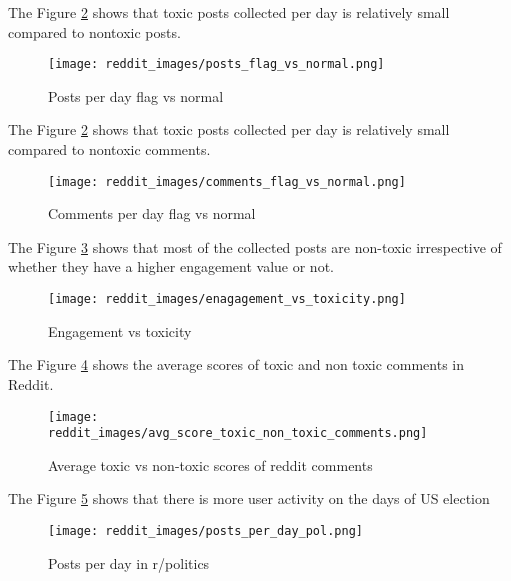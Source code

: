 \documentclass[sigconf]{acmart}
\begin{document}
The Figure \ref{fig:reddit_images/comments_flag_vs_normal} shows that toxic posts collected per day is relatively small compared to nontoxic posts.\newline
\begin{figure}[h]
    \centering
    \texttt{[image: reddit\_images/posts\_flag\_vs\_normal.png]} %
    \caption{Posts per day flag vs normal}
    \label{fig:reddit_images/posts_flag_vs_normal}
\end{figure}


The Figure \ref{fig:reddit_images/comments_flag_vs_normal} shows that toxic posts collected per day is relatively small compared to nontoxic comments.\newline
\begin{figure}[h]
    \centering
    \texttt{[image: reddit\_images/comments\_flag\_vs\_normal.png]} %
    \caption{Comments per day flag vs normal}
    \label{fig:reddit_images/comments_flag_vs_normal}
\end{figure}

The Figure \ref{fig:reddit_images/enagagement_vs_toxicity} shows that most of the collected posts are non-toxic irrespective of whether they have a higher engagement value or not.\newline
\begin{figure}[h]
    \centering
    \texttt{[image: reddit\_images/enagagement\_vs\_toxicity.png]} %
    \caption{Engagement vs toxicity}
    \label{fig:reddit_images/enagagement_vs_toxicity}
\end{figure}

The Figure \ref{fig:reddit_images/avg_score_toxic_non_toxic_comments} shows the average scores of toxic and non toxic comments in Reddit.\newline
\begin{figure}[h]
    \centering
    \texttt{[image: reddit\_images/avg\_score\_toxic\_non\_toxic\_comments.png]} %
    \caption{Average toxic vs non-toxic scores of reddit comments}
    \label{fig:reddit_images/avg_score_toxic_non_toxic_comments}
\end{figure}



The Figure \ref{fig:reddit_images/posts_per_day_pol} shows that there is more user activity on the days of US election\newline
\begin{figure}[h]
    \centering
    \texttt{[image: reddit\_images/posts\_per\_day\_pol.png]} %
    \caption{Posts per day in r/politics}
    \label{fig:reddit_images/posts_per_day_pol}
\end{figure}
\end{document}

